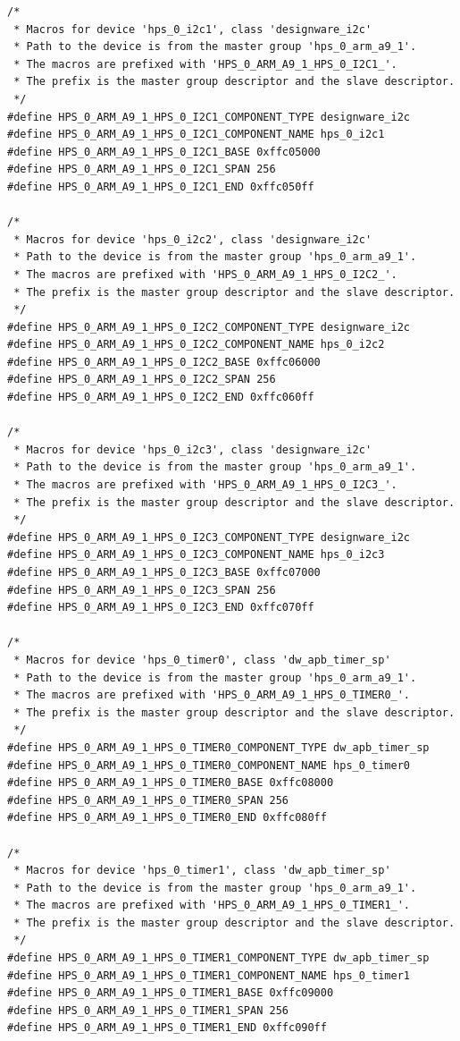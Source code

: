 \documentclass[conference]{IEEEtran}
\begin{document}
\begin{lstlisting}
/*
 * Macros for device 'hps_0_i2c1', class 'designware_i2c'
 * Path to the device is from the master group 'hps_0_arm_a9_1'.
 * The macros are prefixed with 'HPS_0_ARM_A9_1_HPS_0_I2C1_'.
 * The prefix is the master group descriptor and the slave descriptor.
 */
#define HPS_0_ARM_A9_1_HPS_0_I2C1_COMPONENT_TYPE designware_i2c
#define HPS_0_ARM_A9_1_HPS_0_I2C1_COMPONENT_NAME hps_0_i2c1
#define HPS_0_ARM_A9_1_HPS_0_I2C1_BASE 0xffc05000
#define HPS_0_ARM_A9_1_HPS_0_I2C1_SPAN 256
#define HPS_0_ARM_A9_1_HPS_0_I2C1_END 0xffc050ff

/*
 * Macros for device 'hps_0_i2c2', class 'designware_i2c'
 * Path to the device is from the master group 'hps_0_arm_a9_1'.
 * The macros are prefixed with 'HPS_0_ARM_A9_1_HPS_0_I2C2_'.
 * The prefix is the master group descriptor and the slave descriptor.
 */
#define HPS_0_ARM_A9_1_HPS_0_I2C2_COMPONENT_TYPE designware_i2c
#define HPS_0_ARM_A9_1_HPS_0_I2C2_COMPONENT_NAME hps_0_i2c2
#define HPS_0_ARM_A9_1_HPS_0_I2C2_BASE 0xffc06000
#define HPS_0_ARM_A9_1_HPS_0_I2C2_SPAN 256
#define HPS_0_ARM_A9_1_HPS_0_I2C2_END 0xffc060ff

/*
 * Macros for device 'hps_0_i2c3', class 'designware_i2c'
 * Path to the device is from the master group 'hps_0_arm_a9_1'.
 * The macros are prefixed with 'HPS_0_ARM_A9_1_HPS_0_I2C3_'.
 * The prefix is the master group descriptor and the slave descriptor.
 */
#define HPS_0_ARM_A9_1_HPS_0_I2C3_COMPONENT_TYPE designware_i2c
#define HPS_0_ARM_A9_1_HPS_0_I2C3_COMPONENT_NAME hps_0_i2c3
#define HPS_0_ARM_A9_1_HPS_0_I2C3_BASE 0xffc07000
#define HPS_0_ARM_A9_1_HPS_0_I2C3_SPAN 256
#define HPS_0_ARM_A9_1_HPS_0_I2C3_END 0xffc070ff

/*
 * Macros for device 'hps_0_timer0', class 'dw_apb_timer_sp'
 * Path to the device is from the master group 'hps_0_arm_a9_1'.
 * The macros are prefixed with 'HPS_0_ARM_A9_1_HPS_0_TIMER0_'.
 * The prefix is the master group descriptor and the slave descriptor.
 */
#define HPS_0_ARM_A9_1_HPS_0_TIMER0_COMPONENT_TYPE dw_apb_timer_sp
#define HPS_0_ARM_A9_1_HPS_0_TIMER0_COMPONENT_NAME hps_0_timer0
#define HPS_0_ARM_A9_1_HPS_0_TIMER0_BASE 0xffc08000
#define HPS_0_ARM_A9_1_HPS_0_TIMER0_SPAN 256
#define HPS_0_ARM_A9_1_HPS_0_TIMER0_END 0xffc080ff

/*
 * Macros for device 'hps_0_timer1', class 'dw_apb_timer_sp'
 * Path to the device is from the master group 'hps_0_arm_a9_1'.
 * The macros are prefixed with 'HPS_0_ARM_A9_1_HPS_0_TIMER1_'.
 * The prefix is the master group descriptor and the slave descriptor.
 */
#define HPS_0_ARM_A9_1_HPS_0_TIMER1_COMPONENT_TYPE dw_apb_timer_sp
#define HPS_0_ARM_A9_1_HPS_0_TIMER1_COMPONENT_NAME hps_0_timer1
#define HPS_0_ARM_A9_1_HPS_0_TIMER1_BASE 0xffc09000
#define HPS_0_ARM_A9_1_HPS_0_TIMER1_SPAN 256
#define HPS_0_ARM_A9_1_HPS_0_TIMER1_END 0xffc090ff


\end{lstlisting}
\end{document}
